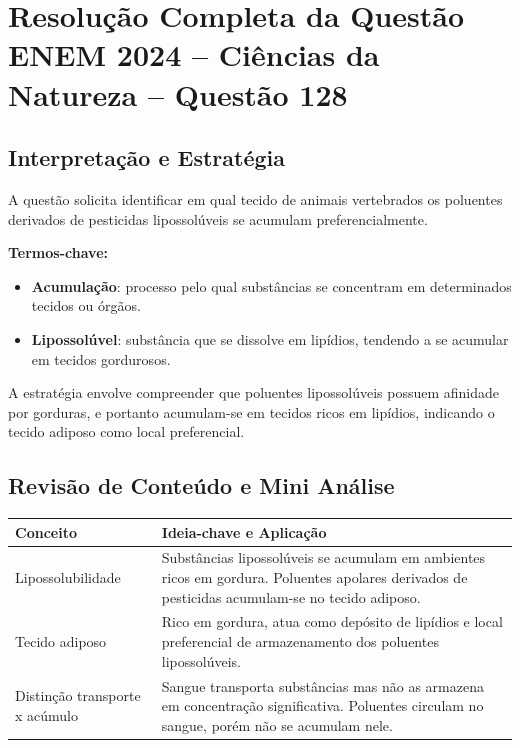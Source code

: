 \documentclass{article}
\begin{document}
\section*{Resolução Completa da Questão ENEM 2024 – Ciências da Natureza – Questão 128}

\subsection*{Interpretação e Estratégia}

A questão solicita identificar em qual tecido de animais vertebrados os poluentes derivados de pesticidas lipossolúveis se acumulam preferencialmente. \par

\textbf{Termos-chave:}
\begin{itemize}
  \item \textbf{Acumulação}: processo pelo qual substâncias se concentram em determinados tecidos ou órgãos.
  \item \textbf{Lipossolúvel}: substância que se dissolve em lipídios, tendendo a se acumular em tecidos gordurosos.
\end{itemize}

A estratégia envolve compreender que poluentes lipossolúveis possuem afinidade por gorduras, e portanto acumulam-se em tecidos ricos em lipídios, indicando o tecido adiposo como local preferencial. 

\subsection*{Revisão de Conteúdo e Mini Análise}

\begin{tabular}{p{} p{}}
\textbf{Conceito} & \textbf{Ideia-chave e Aplicação} \\
\hline
Lipossolubilidade & Substâncias lipossolúveis se acumulam em ambientes ricos em gordura. Poluentes apolares derivados de pesticidas acumulam-se no tecido adiposo. \\
Tecido adiposo & Rico em gordura, atua como depósito de lipídios e local preferencial de armazenamento dos poluentes lipossolúveis. \\
Distinção transporte x acúmulo & Sangue transporta substâncias mas não as armazena em concentração significativa. Poluentes circulam no sangue, porém não se acumulam nele. \\
\end{tabular}
\end{document}
